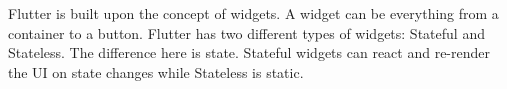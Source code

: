 Flutter is built upon the concept of widgets. A widget can be everything from a container to a button. Flutter has two different types of widgets: Stateful and Stateless. The difference here is state. Stateful widgets can react and re-render the UI on state changes while Stateless is static. 








